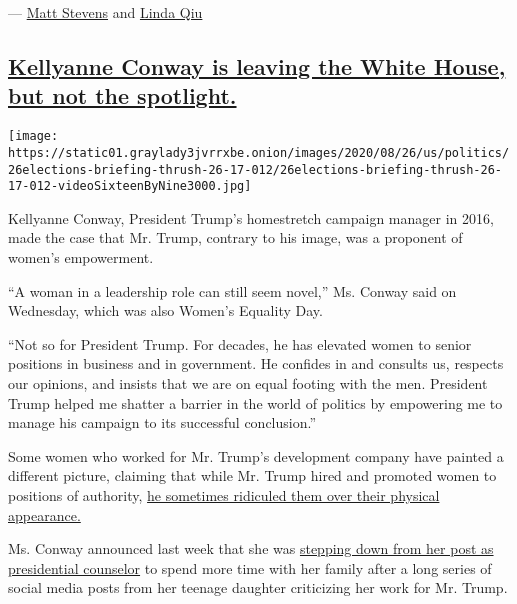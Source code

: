 --- \href{https://www.nytimes3xbfgragh.onion/by/matt-stevens}{Matt
Stevens} and
\href{https://www.nytimes3xbfgragh.onion/by/linda-qiu}{Linda Qiu}

\hypertarget{kellyanne-conway-is-leaving-the-white-house-but-not-the-spotlight}{%
\subsection{\texorpdfstring{\protect\hyperlink{kellyanne-conway-is-leaving-the-white-house-but-not-the-spotlight}{Kellyanne
Conway is leaving the White House, but not the
spotlight.}}{Kellyanne Conway is leaving the White House, but not the spotlight.}}\label{kellyanne-conway-is-leaving-the-white-house-but-not-the-spotlight}}

\texttt{[image: https://static01.graylady3jvrrxbe.onion/images/2020/08/26/us/politics/26elections-briefing-thrush-26-17-012/26elections-briefing-thrush-26-17-012-videoSixteenByNine3000.jpg]}

Kellyanne Conway, President Trump's homestretch campaign manager in
2016, made the case that Mr. Trump, contrary to his image, was a
proponent of women's empowerment.

``A woman in a leadership role can still seem novel,'' Ms. Conway said
on Wednesday, which was also Women's Equality Day.

``Not so for President Trump. For decades, he has elevated women to
senior positions in business and in government. He confides in and
consults us, respects our opinions, and insists that we are on equal
footing with the men. President Trump helped me shatter a barrier in the
world of politics by empowering me to manage his campaign to its
successful conclusion.''

Some women who worked for Mr. Trump's development company have painted a
different picture, claiming that while Mr. Trump hired and promoted
women to positions of authority,
\href{https://www.washingtonpost.com/politics/donald-trump-a-champion-of-women-his-female-employees-think-so/2015/11/23/7eafac80-88da-11e5-9a07-453018f9a0ec_story.html}{he
sometimes ridiculed them over their physical appearance.}

Ms. Conway announced last week that she was
\href{https://www.nytimes3xbfgragh.onion/2020/08/24/us/politics/kellyanne-conway-leaving-white-house.html}{stepping
down from her post as presidential counselor} to spend more time with
her family after a long series of social media posts from her teenage
daughter criticizing her work for Mr. Trump.

